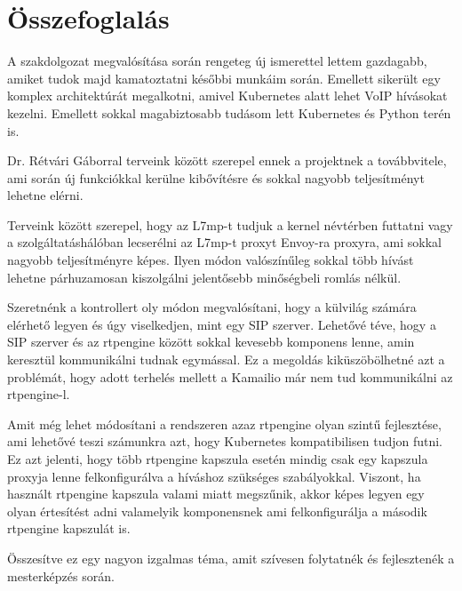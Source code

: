 \chapter{Összefoglalás}

A szakdolgozat megvalósítása során rengeteg új ismerettel lettem gazdagabb, 
amiket tudok majd kamatoztatni későbbi munkáim során. Emellett sikerült 
egy komplex architektúrát megalkotni, amivel Kubernetes alatt lehet 
VoIP hívásokat kezelni. Emellett sokkal magabiztosabb tudásom lett Kubernetes és 
Python terén is. 

Dr. Rétvári Gáborral terveink között szerepel ennek a projektnek a továbbvitele, 
ami során új funkciókkal kerülne kibővítésre és sokkal nagyobb teljesítményt 
lehetne elérni. 

Terveink között szerepel, hogy az L7mp-t tudjuk a kernel névtérben futtatni vagy 
a szolgáltatáshálóban lecserélni az L7mp-t proxyt Envoy-ra proxyra, ami sokkal nagyobb teljesítményre képes. Ilyen módon valószínűleg sokkal több hívást lehetne párhuzamosan kiszolgálni jelentősebb minőségbeli romlás nélkül. 

Szeretnénk a kontrollert oly módon megvalósítani, hogy a külvilág számára elérhető
legyen és úgy viselkedjen, mint egy SIP szerver. Lehetővé téve, hogy a SIP szerver és az 
rtpengine között sokkal kevesebb komponens lenne, amin keresztül kommunikálni tudnak 
egymással. Ez a megoldás kiküszöbölhetné azt a problémát, hogy adott terhelés mellett a 
Kamailio már nem tud kommunikálni az rtpengine-l.

Amit még lehet módosítani a rendszeren azaz rtpengine olyan szintű fejlesztése, ami 
lehetővé teszi számunkra azt, hogy Kubernetes kompatibilisen tudjon futni. Ez azt jelenti,
hogy több rtpengine kapszula esetén mindig csak egy kapszula proxyja lenne felkonfigurálva
a híváshoz szükséges szabályokkal. Viszont, ha használt rtpengine kapszula valami miatt 
megszűnik, akkor képes legyen egy olyan értesítést adni valamelyik komponensnek ami 
felkonfigurálja a második rtpengine kapszulát is.

Összesítve ez egy nagyon izgalmas téma, amit szívesen folytatnék és fejlesztenék 
a mesterképzés során. 